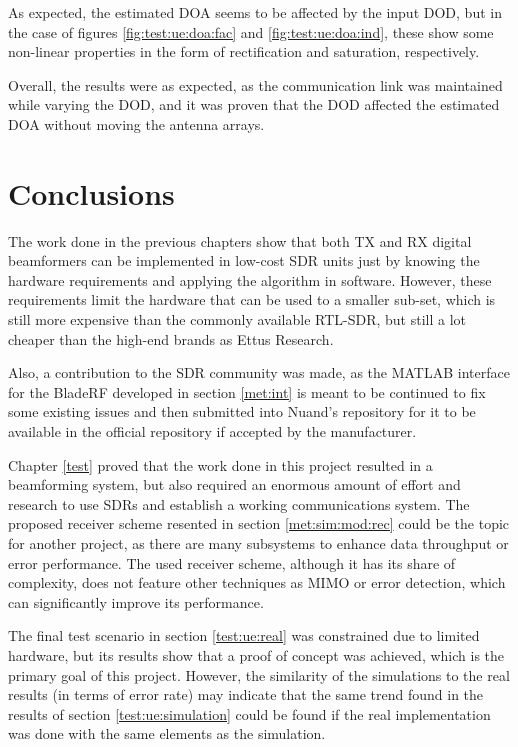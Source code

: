 \documentclass[12pt,a4paper]{report}
\begin{document}
As expected, the estimated DOA seems to be affected by the input DOD, but in the case of figures \ref{fig:test:ue:doa:fac} and \ref{fig:test:ue:doa:ind}, these show some non-linear properties in the form of rectification and saturation, respectively. 

Overall, the results were as expected, as the communication link was maintained while varying the DOD, and it was proven that the DOD affected the estimated DOA without moving the antenna arrays.

\chapter{Conclusions} \label{conc}
The work done in the previous chapters show that both TX and RX digital beamformers can be implemented in low-cost SDR units just by knowing the hardware requirements and applying the algorithm in software. However, these requirements limit the hardware that can be used to a smaller sub-set, which is still more expensive than the commonly available RTL-SDR, but still a lot cheaper than the high-end brands as Ettus Research. 

Also, a contribution to the SDR community was made, as the MATLAB interface for the BladeRF developed in section \ref{met:int} is meant to be continued to fix some existing issues and then submitted into Nuand's repository for it to be available in the official repository if accepted by the manufacturer.

Chapter \ref{test} proved that the work done in this project resulted in a beamforming system, but also required an enormous amount of effort and research to use SDRs and establish a working communications system. The proposed receiver scheme resented in section \ref{met:sim:mod:rec} could be the topic for another project, as there are many subsystems to enhance data throughput or error performance. The used receiver scheme, although it has its share of complexity, does not feature other techniques as MIMO or error detection, which can significantly improve its performance.

The final test scenario in section \ref{test:ue:real} was constrained due to limited hardware, but its results show that a proof of concept was achieved, which is the primary goal of this project. However, the similarity of the simulations to the real results (in terms of error rate) may indicate that the same trend found in the results of section \ref{test:ue:simulation} could be found if the real implementation was done with the same elements as the simulation.
\end{document}
